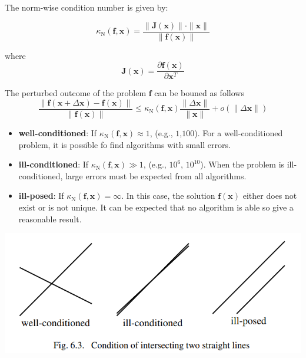 \documentclass[english]{latex4ei/latex4ei_sheet}
\begin{document}
\begin{sectionbox}
    The norm-wise condition number is given by:

    $$\kappa_\text{N}(\mathbf{f}, \mathbf{x}) = \frac{\parallel \mathbf{J}(\mathbf{x})\parallel \cdot \parallel \mathbf{x} \parallel}{\parallel \mathbf{f}(\mathbf{x})\parallel}$$

    where
    $$\mathbf{J}(\mathbf{x}) = \frac{\partial \mathbf{f}(\mathbf{x})}{\partial\mathbf{x}^T}$$

    The perturbed outcome of the problem $\mathbf{f}$ can be bouned as follows
    $$\frac{\parallel \mathbf{f}(\mathbf{x}+\Delta \mathbf{x}) - \mathbf{f}(\mathbf{x})\parallel}{\parallel \mathbf{f}(\mathbf{x})\parallel} \leq \kappa_\text{N}(\mathbf{f}, \mathbf{x}) \frac{\parallel\Delta \mathbf{x} \parallel}{\parallel \mathbf{x}\parallel} + o(\parallel \Delta \mathbf{x} \parallel)$$
    \begin{itemize}
        \item \textbf{well-conditioned}: If $\kappa_\text{N}(\mathbf{f}, \mathbf{x}) \approx 1$, (e.g., $1$,$100$). For a well-conditioned problem, it is possible fo find algorithms with small errors.
        \item \textbf{ill-conditioned}: If $\kappa_\text{N}(\mathbf{f}, \mathbf{x}) \gg 1$, (e.g., $10^6$, $10^10$). When the problem is ill-conditioned, large errors must be expected from all algorithms.
        \item \textbf{ill-posed}: If $\kappa_\text{N}(\mathbf{f}, \mathbf{x}) = \infty$. In this case, the solution $\mathbf{f}(\mathbf{x})$ either does not exist or is not unique. It can be expected that no algorithm is able so give a reasonable result.
    \end{itemize}
\end{sectionbox}
\begin{sectionbox}
    \includegraphics[width=\textwidth]{img/conditions_graphics.png}
\end{sectionbox}
\end{document}
